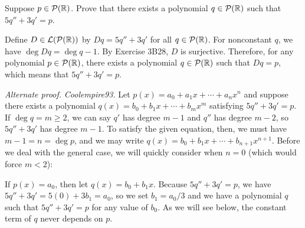 \begin{exc}
\begin{exercise}
Suppose $p\in\mathcal{P}(\mathbb{R})$. Prove that there exists a polynomial $q\in\mathcal{P}(\mathbb{R})$
such that $5q''+3q'=p$.
\end{exercise}
\begin{solution}

Define $D\in\mathcal{L}(\mathcal{P}(\mathbb{R}))$ by $Dq=5q''+3q'$ for all $q\in\mathcal{P}(\mathbb{R})$. For
nonconstant $q$, we have $\deg Dq=\deg q-1$. By Exercise 3B28, $D$ is
surjective. Therefore, for any polynomial $p\in\mathcal{P}(\mathbb{R})$, there exists a
polynomial $q\in\mathcal{P}(\mathbb{R})$ such that $Dq=p$, which means that $5q''+3q'=p$.

\emph{Alternate proof.} \emph{Coolempire93.} Let
$p(x)=a_0+a_1x+\cdots+a_nx^n$ and suppose there exists a polynomial
$q(x)=b_0+b_1x+\cdots+b_mx^m$ satisfying $5q''+3q'=p$. If $\deg q=m\ge2$, we
can say $q'$ has degree $m-1$ and $q''$ has degree $m-2$, so $5q''+3q'$ has
degree $m-1$. To satisfy the given equation, then, we must have
$m-1=n=\deg p$, and we may write $q(x)=b_0+b_1x+\cdots+b_{n+1}x^{n+1}$. Before
we deal with the general case, we will quickly consider when $n=0$ (which would
force $m<2$):

If $p(x)=a_0$, then let $q(x)=b_0+b_1x$. Because $5q''+3q'=p$, we have
$5q''+3q'=5(0)+3b_1=a_0$, so we set $b_1=a_0/3$ and we have a
polynomial $q$ such that $5q''+3q'=p$ for any value of $b_0$. As we will see
below, the constant term of $q$ never depends on $p$.


\end{solution}
\end{exc}
